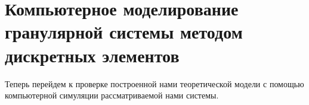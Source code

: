 \chapter{Компьютерное моделирование гранулярной системы методом дискретных элементов}
\label{cha:research}

Теперь перейдем к проверке построенной нами теоретической модели с помощью компьютерной симуляции рассматриваемой нами системы.
